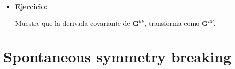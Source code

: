 \begin{itemize}
\item \textbf{Ejercicio:}

Muestre que la derivada covariante de $\mathbf{G}^{\mu\nu}$, transforma como $\mathbf{G}^{\mu\nu}$.
\end{itemize}



\section{Spontaneous symmetry breaking}
